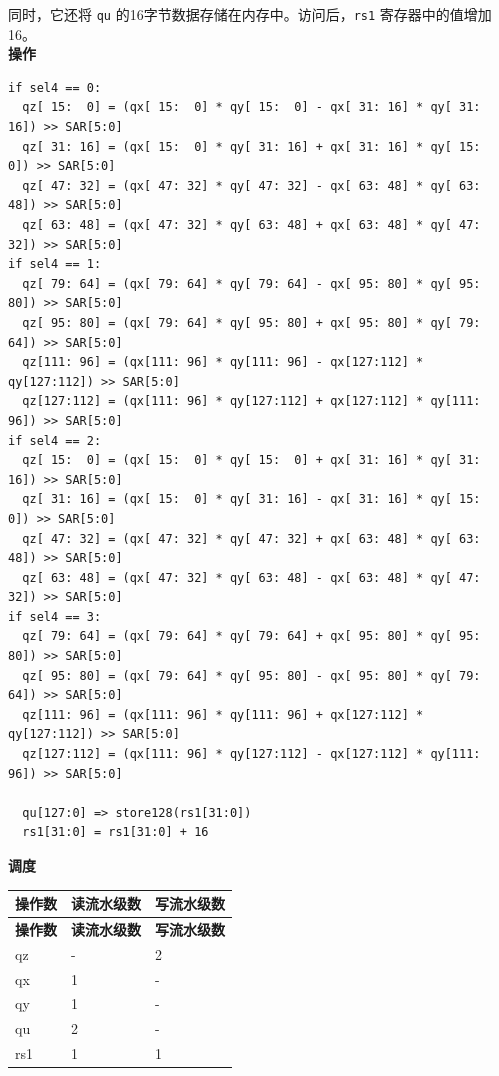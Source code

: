 同时，它还将 \lstinline{qu} 的16字节数据存储在内存中。访问后，\lstinline{rs1} 寄存器中的值增加16。\\
\textbf{操作}
\begin{lstlisting}
if sel4 == 0:
  qz[ 15:  0] = (qx[ 15:  0] * qy[ 15:  0] - qx[ 31: 16] * qy[ 31: 16]) >> SAR[5:0]
  qz[ 31: 16] = (qx[ 15:  0] * qy[ 31: 16] + qx[ 31: 16] * qy[ 15:  0]) >> SAR[5:0]
  qz[ 47: 32] = (qx[ 47: 32] * qy[ 47: 32] - qx[ 63: 48] * qy[ 63: 48]) >> SAR[5:0]
  qz[ 63: 48] = (qx[ 47: 32] * qy[ 63: 48] + qx[ 63: 48] * qy[ 47: 32]) >> SAR[5:0]
if sel4 == 1:
  qz[ 79: 64] = (qx[ 79: 64] * qy[ 79: 64] - qx[ 95: 80] * qy[ 95: 80]) >> SAR[5:0]
  qz[ 95: 80] = (qx[ 79: 64] * qy[ 95: 80] + qx[ 95: 80] * qy[ 79: 64]) >> SAR[5:0]
  qz[111: 96] = (qx[111: 96] * qy[111: 96] - qx[127:112] * qy[127:112]) >> SAR[5:0]
  qz[127:112] = (qx[111: 96] * qy[127:112] + qx[127:112] * qy[111: 96]) >> SAR[5:0]
if sel4 == 2:
  qz[ 15:  0] = (qx[ 15:  0] * qy[ 15:  0] + qx[ 31: 16] * qy[ 31: 16]) >> SAR[5:0]
  qz[ 31: 16] = (qx[ 15:  0] * qy[ 31: 16] - qx[ 31: 16] * qy[ 15:  0]) >> SAR[5:0]
  qz[ 47: 32] = (qx[ 47: 32] * qy[ 47: 32] + qx[ 63: 48] * qy[ 63: 48]) >> SAR[5:0]
  qz[ 63: 48] = (qx[ 47: 32] * qy[ 63: 48] - qx[ 63: 48] * qy[ 47: 32]) >> SAR[5:0]
if sel4 == 3:
  qz[ 79: 64] = (qx[ 79: 64] * qy[ 79: 64] + qx[ 95: 80] * qy[ 95: 80]) >> SAR[5:0]
  qz[ 95: 80] = (qx[ 79: 64] * qy[ 95: 80] - qx[ 95: 80] * qy[ 79: 64]) >> SAR[5:0]
  qz[111: 96] = (qx[111: 96] * qy[111: 96] + qx[127:112] * qy[127:112]) >> SAR[5:0]
  qz[127:112] = (qx[111: 96] * qy[127:112] - qx[127:112] * qy[111: 96]) >> SAR[5:0]

  qu[127:0] => store128(rs1[31:0])
  rs1[31:0] = rs1[31:0] + 16
\end{lstlisting}

\textbf{调度}\\
\begin{longtable}[c]{|l|l|l|}
    \hline
    \rowcolor{lightgray}
    \textbf{操作数} & \textbf{读流水级数} & \textbf{写流水级数} \\\hline
    \endfirsthead
    \hline
    \rowcolor{lightgray}
     \textbf{操作数} & \textbf{读流水级数} & \textbf{写流水级数} \\\hline
    \endhead
    \hline
    \endfoot


    qz & - & 2 \\\hline
     qx & 1 & - \\\hline
     qy & 1 & - \\\hline
     qu & 2 & - \\\hline
     rs1 & 1 & 1

\end{longtable}


